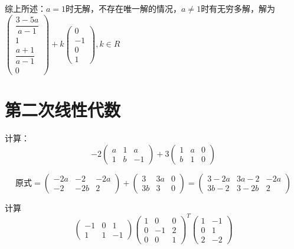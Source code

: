 \documentclass[a4paper]{report}
\begin{document}
\begin{jie}
综上所述：$a=1$时无解，不存在唯一解的情况，$a\neq 1$时有无穷多解，解为$\begin{pmatrix}
\dfrac{3-5a}{a-1}\\[2pt]
1\\
\dfrac{a+1}{a-1}\\[2pt]
0
\end{pmatrix}+k
\begin{pmatrix}
0\\
-1\\
0\\
1
\end{pmatrix},k\in R$
\end{jie}
\chapter{第二次线性代数}
\EX 计算：
\begin{equation*}
-2
\begin{pmatrix}
a&1&a\\ 1&b&-1
\end{pmatrix}+3
\begin{pmatrix}
1&a&0\\ b&1&0
\end{pmatrix}
\end{equation*}

\begin{jie}
\begin{equation*}
\text{原式}=\begin{pmatrix}
-2a&-2&-2a\\ -2&-2b&2
\end{pmatrix}+\begin{pmatrix}
3&3a&0\\ 3b&3&0
\end{pmatrix}=\begin{pmatrix}
3-2a&3a-2&-2a\\ 3b-2&3-2b&2
\end{pmatrix}
\end{equation*}
\end{jie}

\EX 计算
\begin{equation*}
\begin{pmatrix}
-1&0&1\\ 1&1&-1
\end{pmatrix}\begin{pmatrix}
1&0&0\\ 0&-1&2\\ 0&0&1
\end{pmatrix}^{T}\begin{pmatrix}
1&-1\\ 0&1\\ 2&-2
\end{pmatrix}
\end{equation*}
\end{document}
